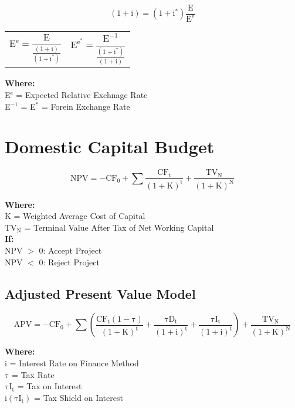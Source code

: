 \documentclass[11pt, english]{article}
\begin{document}
	$$\mathrm{(1+i)=(1+i^*)\frac{E}{E^e}}$$

	\begin{center}
	\begin{tabular}{p{5cm}p{5cm}}
		$$\mathrm{E^e=\frac{E}{\frac{(1+i)}{(1+i^*)}}}$$
		&
		$$\mathrm{E^{e^*}=\frac{E^{-1}}{\frac{(1+i^*)}{(1+i)}}}$$
	\end{tabular}
	\end{center}

	\textbf{Where:}\\
	E$\mathrm{^e}$ = Expected Relative Exchnage Rate\\
	E$\mathrm{^{-1}}$ = E$\mathrm{^*}$ = Forein Exchange Rate

\newpage

\section{Domestic Capital Budget}

	$$\mathrm{NPV=-CF_0+\sum\frac{CF_t}{(1+K)^t}+\frac{TV_N}{(1+K)^N}}$$

	\textbf{Where:}\\
	K = Weighted Average Cost of Capital\\
	TV$\mathrm{_N}$ = Terminal Value After Tax of Net Working Capital\\

	\textbf{If:}\\
	NPV $>$ 0: Accept Project\\
	NPV $<$ 0: Reject Project

	\subsection{Adjusted Present Value Model}

	$$\mathrm{APV=-CF_0+\sum\left(\frac{CF_t(1-\tau)}{(1+K)^t}+\frac{\tau D_t}{(1+i)^t}+\frac{\tau I_t}{(1+i)^t}\right)+\frac{TV_N}{(1+K)^N}}$$

	\textbf{Where:}\\
	i = Interest Rate on Finance Method\\
	$\mathrm{\tau}$ = Tax Rate\\
	$\mathrm{\tau I_t}$ = Tax on Interest\\
	$\mathrm{i(\tau I_t)}$ = Tax Shield on Interest
\end{document}
